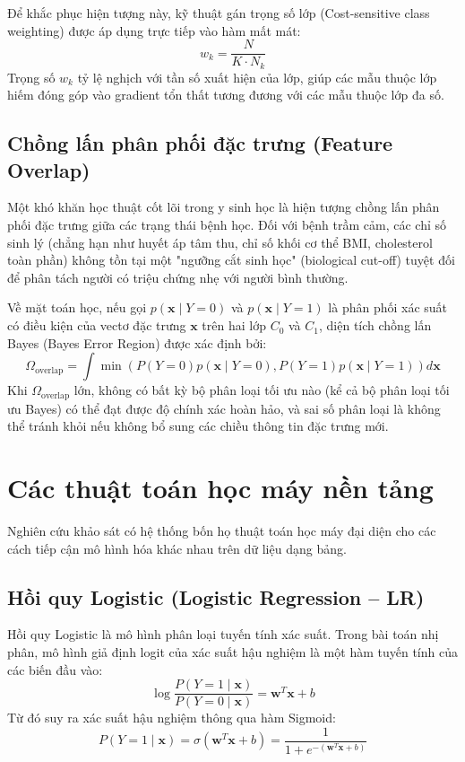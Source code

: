 Để khắc phục hiện tượng này, kỹ thuật gán trọng số lớp (Cost-sensitive class weighting) được áp dụng trực tiếp vào hàm mất mát:
\begin{equation}
    w_k = \frac{N}{K \cdot N_k}
\end{equation}
Trọng số $w_k$ tỷ lệ nghịch với tần số xuất hiện của lớp, giúp các mẫu thuộc lớp hiếm đóng góp vào gradient tổn thất tương đương với các mẫu thuộc lớp đa số.

\subsection{Chồng lấn phân phối đặc trưng (Feature Overlap)}
Một khó khăn học thuật cốt lõi trong y sinh học là hiện tượng chồng lấn phân phối đặc trưng giữa các trạng thái bệnh học. Đối với bệnh trầm cảm, các chỉ số sinh lý (chẳng hạn như huyết áp tâm thu, chỉ số khối cơ thể BMI, cholesterol toàn phần) không tồn tại một "ngưỡng cắt sinh học" (biological cut-off) tuyệt đối để phân tách người có triệu chứng nhẹ với người bình thường. 

Về mặt toán học, nếu gọi $p(\mathbf{x} \mid Y = 0)$ và $p(\mathbf{x} \mid Y = 1)$ là phân phối xác suất có điều kiện của vectơ đặc trưng $\mathbf{x}$ trên hai lớp $C_0$ và $C_1$, diện tích chồng lấn Bayes (Bayes Error Region) được xác định bởi:
\begin{equation}
    \Omega_{\text{overlap}} = \int \min\left(P(Y=0)p(\mathbf{x} \mid Y=0), P(Y=1)p(\mathbf{x} \mid Y=1)\right) d\mathbf{x}
\end{equation}
Khi $\Omega_{\text{overlap}}$ lớn, không có bất kỳ bộ phân loại tối ưu nào (kể cả bộ phân loại tối ưu Bayes) có thể đạt được độ chính xác hoàn hảo, và sai số phân loại là không thể tránh khỏi nếu không bổ sung các chiều thông tin đặc trưng mới.

\section{Các thuật toán học máy nền tảng}
\label{sec:thuat-toan-nen-tang}

Nghiên cứu khảo sát có hệ thống bốn họ thuật toán học máy đại diện cho các cách tiếp cận mô hình hóa khác nhau trên dữ liệu dạng bảng.

\subsection{Hồi quy Logistic (Logistic Regression -- LR)}
Hồi quy Logistic là mô hình phân loại tuyến tính xác suất. Trong bài toán nhị phân, mô hình giả định logit của xác suất hậu nghiệm là một hàm tuyến tính của các biến đầu vào:
\begin{equation}
    \log \frac{P(Y = 1 \mid \mathbf{x})}{P(Y = 0 \mid \mathbf{x})} = \mathbf{w}^T \mathbf{x} + b
\end{equation}
Từ đó suy ra xác suất hậu nghiệm thông qua hàm Sigmoid:
\begin{equation}
    P(Y = 1 \mid \mathbf{x}) = \sigma(\mathbf{w}^T \mathbf{x} + b) = \frac{1}{1 + e^{-(\mathbf{w}^T \mathbf{x} + b)}}
\end{equation}

